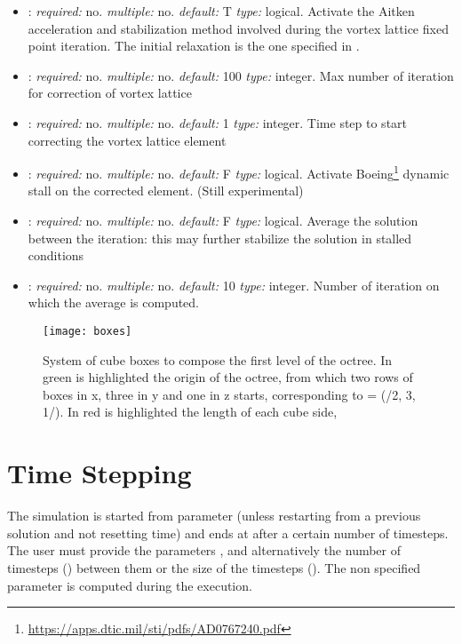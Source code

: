 \begin{itemize}
\item {}: \textit{required:} no. \textit{multiple:} no. 
\textit{default:} T \textit{type:} logical. 
Activate the Aitken acceleration and stabilization method involved during the 
vortex lattice fixed point iteration. 
The initial relaxation is the one specified in . 

\item {}: \textit{required:} no. \textit{multiple:} no. 
\textit{default:} 100 \textit{type:} integer. 
Max number of iteration for correction of vortex lattice

\item {}: \textit{required:} no. \textit{multiple:} no. 
\textit{default:} 1 \textit{type:} integer. 
Time step to start correcting the vortex lattice element

\item {}: \textit{required:} no. \textit{multiple:} no. 
\textit{default:} F \textit{type:} logical. 
Activate Boeing\footnote{\url{https://apps.dtic.mil/sti/pdfs/AD0767240.pdf}} 
dynamic stall on the corrected  element.  (Still experimental)

\item {}: \textit{required:} no. \textit{multiple:} no. 
\textit{default:} F \textit{type:} logical. 
Average the solution between the iteration: this may further stabilize the solution in stalled conditions

\item {}: \textit{required:} no. \textit{multiple:} no. 
\textit{default:} 10 \textit{type:} integer. 
Number of iteration on which the average is computed. 

\end{itemize}

\begin{figure}
\centering
\texttt{[image: boxes]}
\caption{System of cube boxes to compose the first level of the octree. 
In green is highlighted the origin of the octree, from which two rows of 
boxes in x, three in y and one in z starts, corresponding to  = (/2, 3, 1/). 
In red is highlighted the length of each cube side, }
\label{fig:boxes1}
\end{figure}




\section{Time Stepping}
\label{sec:Time_Stepping}
The simulation is started from parameter  
(unless restarting from a previous solution and not resetting time) 
and ends at  after a certain number of timesteps. 
The user must provide the parameters ,  
and alternatively the number of timesteps () between 
them or the size of the timesteps (). The non specified 
parameter is computed during the execution.

